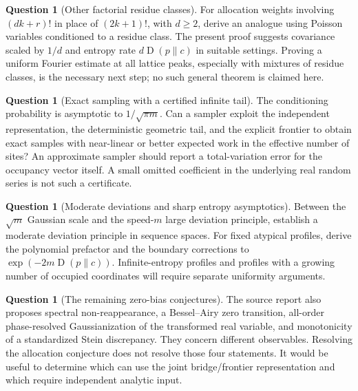 \documentclass[11pt,a4paper]{article}
\numberwithin{equation}{section}
\theoremstyle{definition}
\newtheorem{question}[theorem]{Question}
\theoremstyle{remark}
\newcommand{\KL}{\operatorname{D}}
\begin{document}
\begin{question}[Other factorial residue classes]
For allocation weights involving $(dk+r)!$ in place of $(2k+1)!$,
with $d\ge2$, derive an analogue using Poisson variables conditioned
to a residue class. The present proof suggests covariance scaled by
$1/d$ and entropy rate $d\KL(p\|c)$ in suitable settings. Proving a
uniform Fourier estimate at all lattice peaks, especially with mixtures
of residue classes, is the necessary next step; no such general theorem
is claimed here.
\end{question}

\begin{question}[Exact sampling with a certified infinite tail]
The conditioning probability is asymptotic to $1/\sqrt{\pi m}$.
Can a sampler exploit the independent representation, the deterministic
geometric tail, and the explicit frontier to obtain exact samples with
near-linear or better expected work in the effective number of sites?
An approximate sampler should report a total-variation error for the
occupancy vector itself. A small omitted coefficient in the underlying
real random series is not such a certificate.
\end{question}

\begin{question}[Moderate deviations and sharp entropy asymptotics]
Between the $\sqrt m$ Gaussian scale and the speed-$m$ large deviation
principle, establish a moderate deviation principle in sequence spaces.
For fixed atypical profiles, derive the polynomial prefactor and the
boundary corrections to $\exp(-2m\KL(p\|c))$.
Infinite-entropy profiles and profiles with a growing number of occupied
coordinates will require separate uniformity arguments.
\end{question}

\begin{question}[The remaining zero-bias conjectures]
The source report also proposes spectral non-reappearance, a Bessel--Airy
zero transition, all-order phase-resolved Gaussianization of the transformed
real variable, and monotonicity of a standardized Stein discrepancy.
They concern different observables. Resolving the allocation conjecture
does not resolve those four statements. It would be useful to determine
which can use the joint bridge/frontier representation and which require
independent analytic input.
\end{question}
\end{document}
